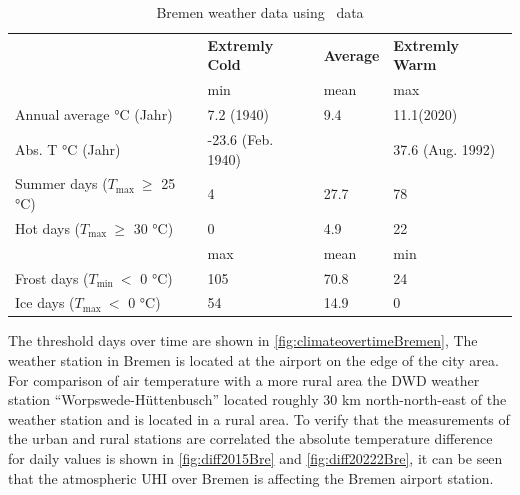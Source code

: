 \documentclass[12pt,a4paper, english]{article}
\begin{document}
  \begin{table}[ht]
    \centering
    \caption{Bremen weather data using~\autocite{DWD2024a} data\label{tab:statsBremen}}
  \renewcommand{\arraystretch}{1.4}
    \begin{tabular}{p{3.5cm}p{2.5cm}lp{2.5cm}}
      \toprule
      & \textbf{Extremly Cold} & \textbf{Average} & \textbf{Extremly Warm} \\
      & min & mean & max \\
      \midrule
      Annual average °C \newline (Jahr)     &   7.2 \newline(1940)       & 9.4    & 11.1\newline (2020)      \\
      Abs. T °C \newline (Jahr)             & -23.6 \newline(Feb. 1940)  &        & 37.6 \newline(Aug. 1992) \\
      Summer days \newline($T_{\max}~\ge$  25 °C) & 4                    & 27.7   & 78 \\
      Hot days \newline($T_{\max}~\ge$  30 °C)    & 0                    & 4.9    & 22 \\
      \midrule
      & max & mean & min \\
      \midrule
      Frost days \newline($T_{\min}~<$  0 °C)     & 105         & 70.8   & 24 \\
      Ice days \newline($T_{\max}~<$  0 °C)       & 54          & 14.9   & 0  \\
      \bottomrule
    \end{tabular}
  \end{table}
%
   The threshold days over time are shown in \cref{fig:climateovertimeBremen},
   The weather station in Bremen is located at the airport on the edge of the city area. %
   For comparison of air temperature with a more rural area the \gls{DWD} weather station ``Worpswede-Hüttenbusch'' located roughly 30 km north-north-east of the weather station and is located in a rural area. 
   To verify that the measurements of the urban and rural stations are correlated the absolute temperature difference for daily values is shown in \cref{fig:diff2015Bre} and \cref{fig:diff20222Bre}, it can be seen that the atmospheric \gls{UHI} over Bremen is affecting the Bremen airport station. 
\end{document}
